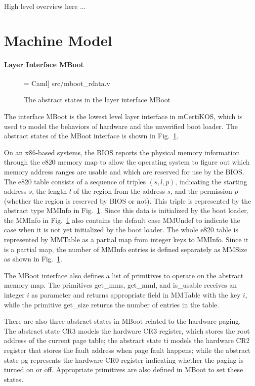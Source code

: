 High level overview here ...

\section{Machine Model}
\paragraph{Layer Interface MBoot}

\begin{figure}
 = Caml] {src/mboot_rdata.v}
\caption{The abstract states in the layer interface MBoot}
\label{fig:ref:mboot_rdata}
\end{figure}

The interface MBoot is the lowest level layer interface in mCertiKOS, which is
used to model the behaviors of hardware and the unverified boot loader.
The abstract states of the MBoot interface is shown in Fig.~\ref{fig:ref:mboot_rdata}.

On an x86-based systems, the BIOS reports the physical memory information
through the \textsf{e820} memory map to allow the operating system to figure out
which memory address ranges are usable and which are reserved for use by the BIOS.
The \textsf{e820} table consists of a sequence of triples $(s, l, p)$, indicating
the starting address $s$, the length $l$ of the region from the address $s$, and
the permission $p$ (whether the region is reserved by BIOS or not). This triple
is represented by the abstract type \textsf{MMInfo} in Fig.~\ref{fig:ref:mboot_rdata}.
Since this data is initialized by the boot loader, the
\textsf{MMInfo} in Fig.~\ref{fig:ref:mboot_rdata} also contains the default case
\textsf{MMUndef} to indicate the case when it is not yet initialized by the boot loader.
The whole \textsf{e820} table is represented by \textsf{MMTable} as a partial map
from integer keys to \textsf{MMInfo}. Since it is a partial map, the number of
\textsf{MMInfo} entries is defined separately as \textsf{MMSize} as shown in
Fig.~\ref{fig:ref:mboot_rdata}.

The MBoot interface also defines a list of primitives to operate on the abstract
memory map. The primitives \textsf{get\_mms}, \textsf{get\_mml}, and \textsf{is\_usable}
receives an integer $i$ as parameter and returns appropriate field in \textsf{MMTable}
with the key $i$, while the primitive \textsf{get\_size} returns the number of
entries in the table.

There are also three abstract states in MBoot related to the hardware paging.
The abstract state \textsf{CR3} models the hardware \textsf{CR3} register,
which stores the root address of the current page table; the abstract state
\textsf{ti} models the hardware \textsf{CR2} register that stores the fault address
when page fault happens; while the abstract state \textsf{pg} represents
the hardware \textsf{CR0} register indicating whether the paging is turned on or off.
Appropriate primitives are also defined in MBoot to set these states.

